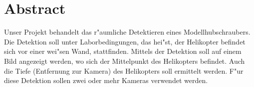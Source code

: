 \chapter*{Abstract}
Unser Projekt behandelt das r"aumliche Detektieren eines Modellhubschraubers. Die Detektion soll unter Laborbedingungen, das hei"st, der Helikopter befindet sich vor einer wei"sen Wand, stattfinden. Mittels der Detektion soll auf einem Bild angezeigt werden, wo sich der Mittelpunkt des Helikopters befindet. Auch die Tiefe (Entfernung zur Kamera) des Helikopters soll ermittelt werden. F"ur diese Detektion sollen zwei oder mehr Kameras verwendet werden.